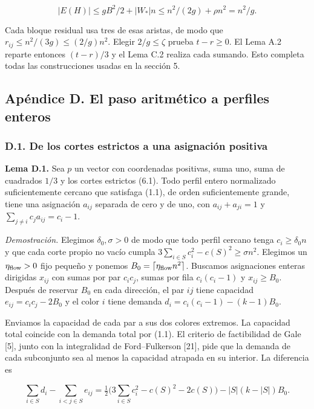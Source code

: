 \documentclass[spanish,11pt,a4paper]{article}
\begin{document}
\[|E(H)|\le gB^2/2+|W_\ast|n\le n^2/(2g)+\rho n^2=n^2/g.\]

Cada bloque residual usa tres de esas aristas, de modo que \(r_{ij}\le n^2/(3g)\le(2/g)n^2\). Elegir \(2/g\le\zeta\) prueba \(t-r\ge0\). El Lema A.2 reparte entonces \((t-r)/3\) y el Lema C.2 realiza cada sumando. Esto completa todas las construcciones usadas en la sección 5.

\subsection{Apéndice D. El paso aritmético a perfiles enteros}\label{apuxe9ndice-d.-el-paso-aritmuxe9tico-a-perfiles-enteros}

\subsubsection{D.1. De los cortes estrictos a una asignación positiva}\label{d.1.-de-los-cortes-estrictos-a-una-asignaciuxf3n-positiva}

\textbf{Lema D.1.} Sea \(p\) un vector con coordenadas positivas, suma uno, suma de cuadrados \(1/3\) y los cortes estrictos (6.1). Todo perfil entero normalizado suficientemente cercano que satisfaga (1.1), de orden suficientemente grande, tiene una asignación \(a_{ij}\) separada de cero y de uno, con \(a_{ij}+a_{ji}=1\) y \(\sum_{j\ne i}c_ja_{ij}=c_i-1\).

\emph{Demostración.} Elegimos \(\delta_0,\sigma>0\) de modo que todo perfil cercano tenga \(c_i\ge\delta_0n\) y que cada corte propio no vacío cumpla \(3\sum_{i\in S}c_i^2-c(S)^2\ge\sigma n^2\). Elegimos un \(\eta_{\rm flow}>0\) fijo pequeño y ponemos \(B_0=\lceil\eta_{\rm flow} n^2\rceil\). Buscamos asignaciones enteras dirigidas \(x_{ij}\) con sumas por par \(c_ic_j\), sumas por fila \(c_i(c_i-1)\) y \(x_{ij}\ge B_0\). Después de reservar \(B_0\) en cada dirección, el par \(ij\) tiene capacidad \(e_{ij}=c_ic_j-2B_0\) y el color \(i\) tiene demanda \(d_i=c_i(c_i-1)-(k-1)B_0\).

Enviamos la capacidad de cada par a sus dos colores extremos. La capacidad total coincide con la demanda total por (1.1). El criterio de factibilidad de Gale {[}5{]}, junto con la integralidad de Ford--Fulkerson {[}21{]}, pide que la demanda de cada subconjunto sea al menos la capacidad atrapada en su interior. La diferencia es

\[\sum_{i\in S}d_i-\sum_{i<j\in S}e_{ij}=\tfrac12\bigl(3\sum_{i\in S}c_i^2-c(S)^2-2c(S)\bigr)-|S|(k-|S|)B_0.\tag{D.1}\]
\end{document}
